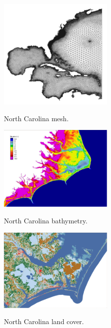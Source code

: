 \documentclass[jmse,article,submit,moreauthors,pdftex,12pt,a4paper]{mdpi}
\begin{document}

\begin{figure}[t]
  \centering
  \includegraphics[width=0.5\textwidth]{ncv6b_mesh}\\
  \caption{North Carolina mesh.}
  \label{fig:nc_mesh}
\end{figure}

\begin{figure}[t]
  \centering
  \includegraphics[width=0.5\textwidth]{ncv6b_bathy}\\
  \caption{North Carolina bathymetry.}
  \label{fig:nc_bathy}
\end{figure}

\begin{figure}[t]
  \centering
  \includegraphics[width=0.5\textwidth]{nc_landcover}\\
  \caption{North Carolina land cover.}
  \label{fig:nc_landcover}
\end{figure}
\end{document}
